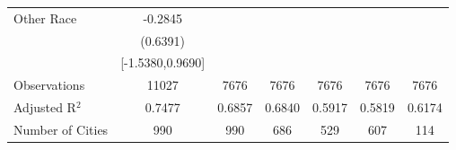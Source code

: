 \documentclass{article}
\begin{document}
\begin{table}[htbp]
\begin{tabular}{l*{6}{c}}
Other Race          &     -0.2845   &               &               &               &               &               \\
                    &    (0.6391)   &               &               &               &               &               \\
                    &[-1.5380,0.9690]   &               &               &               &               &               \\
\midrule
Observations        &       11027   &        7676   &        7676   &        7676   &        7676   &        7676   \\
Adjusted R$^2$      &      0.7477   &      0.6857   &      0.6840   &      0.5917   &      0.5819   &      0.6174   \\
Number of Cities    &         990   &         990   &         686   &         529   &         607   &         114   \\
\bottomrule
\end{tabular}
\end{table}
\end{document}
